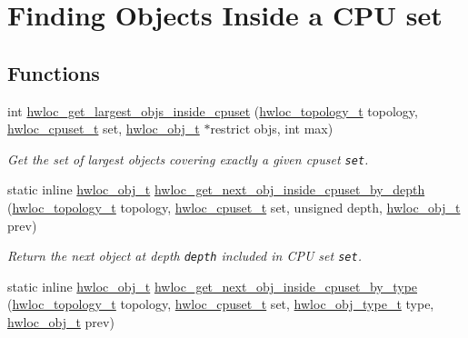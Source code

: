 \hypertarget{group__hwlocality__helper__find__inside}{
\section{Finding Objects Inside a CPU set}
\label{group__hwlocality__helper__find__inside}
}
\subsection*{Functions}
\begin{CompactItemize}
\item 
int \hyperlink{group__hwlocality__helper__find__inside_g762bf572ecf691ad812977ce29496ac2}{hwloc\_\-get\_\-largest\_\-objs\_\-inside\_\-cpuset} (\hyperlink{group__hwlocality__topology_g9d1e76ee15a7dee158b786c30b6a6e38}{hwloc\_\-topology\_\-t} topology, \hyperlink{group__hwlocality__cpuset_g82e51d695c430832b703dad5ab8d75e4}{hwloc\_\-cpuset\_\-t} set, \hyperlink{structhwloc__obj}{hwloc\_\-obj\_\-t} $\ast$restrict objs, int max)
\begin{CompactList}\small\item\em Get the set of largest objects covering exactly a given cpuset {\tt set}. \item\end{CompactList}\item 
static inline \hyperlink{structhwloc__obj}{hwloc\_\-obj\_\-t} \hyperlink{group__hwlocality__helper__find__inside_g9f0cdb50962d59220a557757278e1919}{hwloc\_\-get\_\-next\_\-obj\_\-inside\_\-cpuset\_\-by\_\-depth} (\hyperlink{group__hwlocality__topology_g9d1e76ee15a7dee158b786c30b6a6e38}{hwloc\_\-topology\_\-t} topology, \hyperlink{group__hwlocality__cpuset_g82e51d695c430832b703dad5ab8d75e4}{hwloc\_\-cpuset\_\-t} set, unsigned depth, \hyperlink{structhwloc__obj}{hwloc\_\-obj\_\-t} prev)
\begin{CompactList}\small\item\em Return the next object at depth {\tt depth} included in CPU set {\tt set}. \item\end{CompactList}\item 
static inline \hyperlink{structhwloc__obj}{hwloc\_\-obj\_\-t} \hyperlink{group__hwlocality__helper__find__inside_g060d4f60652ef68bc25bf83e5db1fdb9}{hwloc\_\-get\_\-next\_\-obj\_\-inside\_\-cpuset\_\-by\_\-type} (\hyperlink{group__hwlocality__topology_g9d1e76ee15a7dee158b786c30b6a6e38}{hwloc\_\-topology\_\-t} topology, \hyperlink{group__hwlocality__cpuset_g82e51d695c430832b703dad5ab8d75e4}{hwloc\_\-cpuset\_\-t} set, \hyperlink{group__hwlocality__types_gcd37bb612667dc437d66bfb175a8dc55}{hwloc\_\-obj\_\-type\_\-t} type, \hyperlink{structhwloc__obj}{hwloc\_\-obj\_\-t} prev)

\end{CompactItemize}
